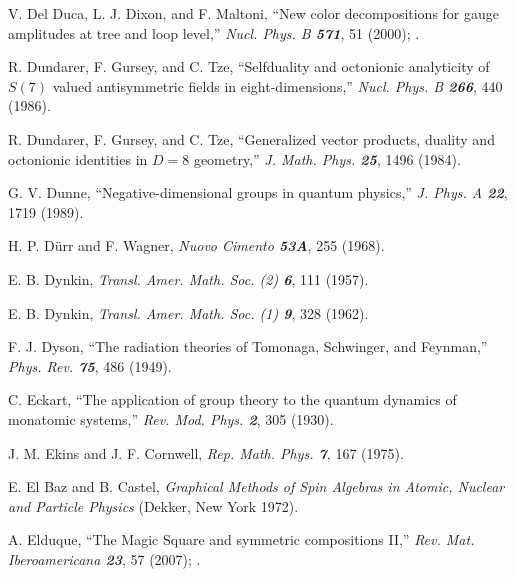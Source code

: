  V. Del Duca, L. J. Dixon, and F. Maltoni,
        ``New color decompositions for gauge amplitudes
        at tree and loop level,''
        {\em Nucl. Phys. B \bf 571}, 51 (2000); %
        .

R. Dundarer, F. Gursey, and C. Tze,
``Selfduality and octonionic analyticity of $S(7)$ valued antisymmetric fields
in eight-dimensions,''
{\em Nucl.  Phys.   B \bf 266}, 440 (1986).

R. Dundarer, F. Gursey, and C. Tze,
``Generalized vector products, duality and octonionic
identities in $D = 8$ geometry,''
{\em J.  Math.  Phys.    \bf 25}, 1496 (1984).

 G. V. Dunne,
    ``Negative-dimensional groups in quantum physics,''
    {\em J. Phys. A \bf  22}, 1719 (1989). %

H. P. D{\"u}rr and F. Wagner,
{\em Nuovo Cimento  \bf 53A}, 255 (1968).

 E. B. Dynkin,
{\em Transl. Amer. Math. Soc. (2)  \bf 6}, 111 (1957).

 E. B. Dynkin,
{\em Transl. Amer. Math. Soc. (1)  \bf 9}, 328 (1962).

 F. J. Dyson,
``The radiation theories of Tomonaga, Schwinger, and Feynman,''
{\em Phys. Rev. \bf 75}, 486 (1949). %


 C. Eckart,
``The application of group theory to the quantum dynamics of monatomic
systems,''
{\em Rev. Mod. Phys.  \bf 2}, 305 (1930).

J. M. Ekins and J. F. Cornwell,
{\em Rep. Math. Phys.  \bf 7}, 167 (1975).

 E. El Baz and B. Castel,
{\em Graphical Methods of Spin Algebras in Atomic,
Nuclear and Particle Physics}
(Dekker, New York 1972).

  A. Elduque,
    ``The Magic Square and symmetric compositions II,''
    {\em Rev. Mat. Iberoamericana \bf 23}, 57 (2007); %
    .

